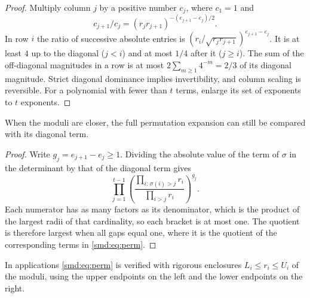 \begin{proof}
Multiply column $j$ by a positive number $c_j$, where $c_1=1$ and
\[
 c_{j+1}/c_j=(r_jr_{j+1})^{-(e_{j+1}-e_j)/2} .
\]
In row $i$ the ratio of successive
absolute entries is $(r_i/\sqrt{r_jr_{j+1}})^{e_{j+1}-e_j}$. It is at least $4$ up to the
diagonal ($j<i$) and at most $1/4$ after it ($j\ge i$). The sum of the off-diagonal
magnitudes in a row is at most $2\sum_{m\ge1}4^{-m}=2/3$ of its diagonal magnitude.
Strict diagonal dominance implies invertibility, and column scaling is reversible. For a
polynomial with fewer than $t$ terms, enlarge its set of exponents to $t$ exponents.
\end{proof}

When the moduli are closer, the full permutation expansion can still be compared with its
diagonal term.


\begin{proof}
Write $g_j=e_{j+1}-e_j\ge1$. Dividing the absolute value of the term of $\sigma$ in the
determinant by that of the diagonal term gives
\[
 \prod_{j=1}^{t-1}\left(\frac{\prod_{i:\,\sigma(i)>j}r_i}{\prod_{i>j}r_i}\right)^{g_j}.
\]
Each numerator has as many factors as its denominator, which is the product of the largest
radii of that cardinality, so each bracket is at most one. The quotient is therefore
largest when all gaps equal one, where it is the quotient of the corresponding terms in
\eqref{smd:eq:perm}.
\end{proof}

In applications \eqref{smd:eq:perm} is verified with rigorous enclosures
$L_i\le r_i\le U_i$ of the moduli, using the upper endpoints on the left and the lower
endpoints on the right.

